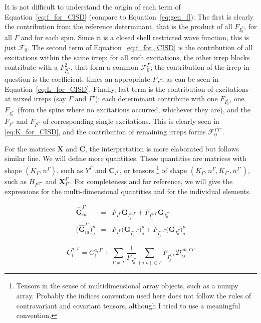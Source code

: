 \documentclass[a4paper,11pt]{article}
\newcommand{\Dmix}{\ensuremath{\mathcal{D}}}
\newcommand{\matG}{\ensuremath{{\mathbf{G}}}}
\newcommand{\irp}{\ensuremath{\Gamma}}
\newcommand{\irpP}{{\ensuremath{\Gamma'}}}
\newcommand{\irpB}{{\ensuremath{\overline{\Gamma}}}}
\begin{document}
It is not difficult to understand the origin of each term of Equation~\eqref{eq:f_for_CISD} (compare to Equation~\eqref{eq:gen_f}):
The first is clearly the contribution from the reference determinant, that is the product of all $F_{I_0^\irp}$, for all $\irp$ and for each spin.
Since it is a closed shell restricted wave function, this is just $\mathcal{F}_0$.
The second term of Equation~\eqref{eq:f_for_CISD} is the contribution of all excitations within the same irrep:
for all such excitations, the other irrep blocks contribute with a $F_{I_0^\irpP}^2$, that form a common $\mathcal{F}_0^\irp$;
the contribution of the irrep in question is the coefficient, times an appropriate $F_{I^\irp}$, as can be seen in Equation~\eqref{eq:L_for_CISD}.
Finally, last term is the contribution of excitations at mixed irreps (say $\irp$ and $\irpP$):
each determinant contribute with one $F_{I_0^\irp}$, one $F_{I_0^\irpP}$ (from the spins where no excitations occurred, whichever they are), and the $F_{I^\irp}$ and $F_{I^\irpP}$ of corresponding single excitations.
This is clearly seen in \eqref{eq:K_for_CISD}, and the contribution of remaining irreps forms $\mathcal{F}_0^{\irp\irpP}$.

For the matrices $\mathbf{X}$ and $\mathbf{C}$, the interpretation is more elaborated but follows similar line.
We will define more quantities.
These quantities are matrices with shape $(K_\irp,n^\irp)$, such as $Y^\irp$ and $\mathbf{C}_{I^\irp}$, or tensors
\footnote{Tensors in the sense of multidimensional array objects, such as a numpy array. Probably the indices convention used here does not follow the rules of contravariant and covariant tensors, although I tried to use a meaningful convention.}
of shape $(K_\irp,n^\irp,K_\irpP,n^\irpP)$, such as $H_{I^{\irp\irpP}}$ and $\mathbf{X}^\irp_\irpP$.
For completeness and for reference, we will give the expressions for the multi-dimensional quantities and for the individual elements.

\begin{eqnarray}
  \hat{\matG}_{ia}^\irp
  &=& F_{I_0^\irp} \matG_{I_i^{a,\irp}}
      + F_{I_i^{a,\irp}} \matG_{I_0^\irp}\\
  \big( \hat{\matG}_{ia}^\irp \big)^p_q
  &=& F_{I_0^\irp} \big( \matG_{I_i^{a,\irp}}\big)^p_q
      + F_{I_i^{a,\irp}} \big( \matG_{I_0^\irp}\big)^p_q
\end{eqnarray}

\begin{equation}
  \overline{C}_i^{a,\irp} = C_{i}^{a, \irp}
  + \sum_{\irpB \ne \irp} \frac{1}{F_{I_0^{\irpB}}}
  \sum_{(j,b) \in \irpB} F_{I_j^{b,\irpB}} \Dmix_{ij}^{ab, \irp\irpB}
\end{equation}
\end{document}
